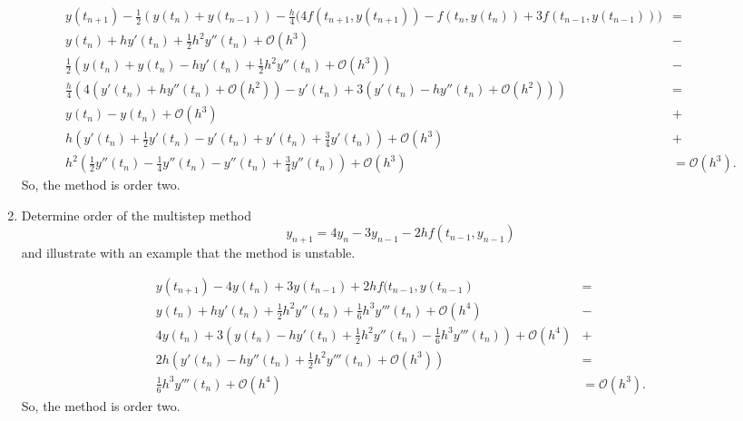 \documentclass[a4paper,12pt]{article}
\newcommand{\bigO}{\mathcal{O}}
\begin{document}
\begin{enumerate}[label = (\arabic*)]
	\begin{align*}
		y(t_{n + 1}) - \frac{1}{2} (y(t_n) + y(t_{n - 1})) - \frac{h}{4} \big(4 f(t_{n + 1}, y(t_{n + 1})) - f(t_n, y(t_n)) + 3 f(t_{n - 1}, y(t_{n - 1}))\big) &= \\
		y(t_n) + h y'(t_n) + \frac{1}{2} h^2 y''(t_n) + \bigO(h^3) &- \\
		\frac{1}{2}(y(t_n) + y(t_n) - hy'(t_n) + \frac{1}{2} h^2 y''(t_n) + \bigO(h^3)) &- \\
		\frac{h}{4}(4(y'(t_n) + h y''(t_n) + \bigO(h^2)) - y'(t_n) + 3(y'(t_n) - h y''(t_n) + \bigO(h^2))) &= \\
		y(t_n) - y(t_n) + \bigO(h^3) &+ \\
		h\left(y'(t_n) + \frac{1}{2} y'(t_n) - y'(t_n) + y'(t_n) + \frac{3}{4} y'(t_n)\right) + \bigO(h^3) &+ \\
		h^2\left(\frac{1}{2} y''(t_n) - \frac{1}{4} y''(t_n) - y''(t_n) + \frac{3}{4} y''(t_n)\right) + \bigO(h^3) &= \bigO(h^3).
	\end{align*}
	So, the method is order two.
	
	\newpage
	\item Determine order of the multistep method
	\[
		y_{n + 1} = 4y_n - 3y_{n - 1} - 2h f(t_{n - 1}, y_{n - 1})
	\]
	and illustrate with an example that the method is unstable.
	
	\begin{align*}
		y(t_{n + 1}) - 4y(t_n) + 3y(t_{n - 1}) + 2h f(t_{n - 1}, y(t_{n - 1}) &= \\
		y(t_n) + h y'(t_n) + \frac{1}{2} h^2 y''(t_n) + \frac{1}{6} h^3 y'''(t_n) + \bigO(h^4) &- \\
		4y(t_n) + 3(y(t_n) - h y'(t_n) + \frac{1}{2} h^2 y''(t_n) - \frac{1}{6} h^3 y'''(t_n)) + \bigO(h^4) &+ \\
		2h(y'(t_n) - h y''(t_n) + \frac{1}{2} h^2 y'''(t_n) + \bigO(h^3)) &= \\
		\frac{1}{6}h^3 y'''(t_n) + \bigO(h^4) &= \bigO(h^3).
	\end{align*}
	So, the method is order two.
	

\end{enumerate}
\end{document}
